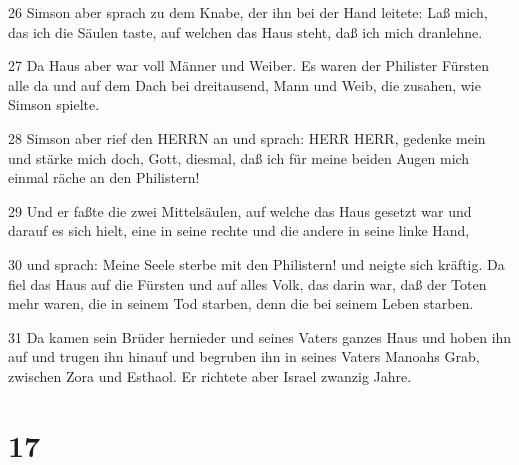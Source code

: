 \par 26 Simson aber sprach zu dem Knabe, der ihn bei der Hand leitete: Laß mich, das ich die Säulen taste, auf welchen das Haus steht, daß ich mich dranlehne.
\par 27 Da Haus aber war voll Männer und Weiber. Es waren der Philister Fürsten alle da und auf dem Dach bei dreitausend, Mann und Weib, die zusahen, wie Simson spielte.
\par 28 Simson aber rief den HERRN an und sprach: HERR HERR, gedenke mein und stärke mich doch, Gott, diesmal, daß ich für meine beiden Augen mich einmal räche an den Philistern!
\par 29 Und er faßte die zwei Mittelsäulen, auf welche das Haus gesetzt war und darauf es sich hielt, eine in seine rechte und die andere in seine linke Hand,
\par 30 und sprach: Meine Seele sterbe mit den Philistern! und neigte sich kräftig. Da fiel das Haus auf die Fürsten und auf alles Volk, das darin war, daß der Toten mehr waren, die in seinem Tod starben, denn die bei seinem Leben starben.
\par 31 Da kamen sein Brüder hernieder und seines Vaters ganzes Haus und hoben ihn auf und trugen ihn hinauf und begruben ihn in seines Vaters Manoahs Grab, zwischen Zora und Esthaol. Er richtete aber Israel zwanzig Jahre.

\chapter{17}

